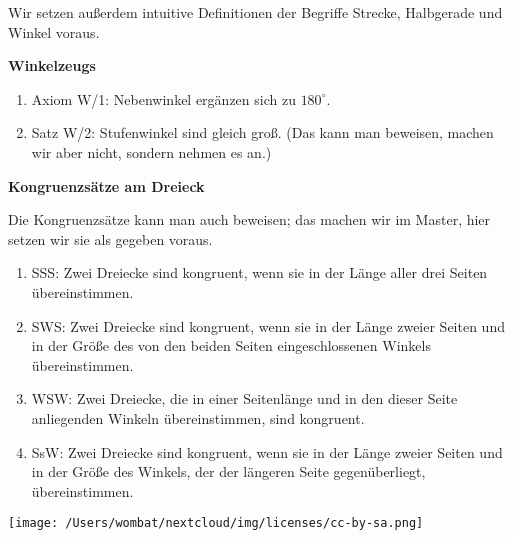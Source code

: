 \documentclass[12pt,a4paper,oneside,ngerman]{article}
\begin{document}
Wir setzen außerdem intuitive Definitionen der Begriffe Strecke, Halbgerade und Winkel voraus.
\newpage

\textbf{Winkelzeugs}
\begin{enumerate}
\item Axiom W/1: Nebenwinkel ergänzen sich zu $180^\circ$.
\item Satz W/2: Stufenwinkel sind gleich groß. (Das kann man beweisen, machen wir aber nicht, sondern nehmen es an.)
\end{enumerate}

\textbf{Kongruenzsätze am Dreieck}

Die Kongruenzsätze kann man auch beweisen; das machen wir im Master, hier setzen wir sie als gegeben voraus.
\begin{enumerate}
\item SSS: Zwei Dreiecke sind kongruent, wenn sie in der Länge aller drei Seiten übereinstimmen. 
\item SWS: Zwei Dreiecke sind kongruent, wenn sie in der Länge zweier Seiten und in der Größe des von den beiden Seiten eingeschlossenen Winkels übereinstimmen. 
\item WSW: Zwei Dreiecke, die in einer Seitenlänge und in den dieser Seite anliegenden Winkeln übereinstimmen, sind kongruent.
\item SsW: Zwei Dreiecke sind kongruent, wenn sie in der Länge zweier Seiten und in der Größe des Winkels, der der längeren Seite gegenüberliegt, übereinstimmen. 
\end{enumerate}


\vspace*{10mm}
\texttt{[image: /Users/wombat/nextcloud/img/licenses/cc-by-sa.png]}
\end{document}
